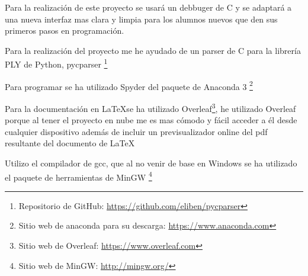 
Para la realización de este proyecto se usará un debbuger de C y se adaptará a una nueva interfaz mas clara y limpia para los alumnos nuevos que den sus primeros pasos en programación.

Para la realización del proyecto me he ayudado de un parser de C para la librería PLY de Python, pycparser \footnote{Repositorio de GitHub: \url{https://github.com/eliben/pycparser}}

Para programar se ha utilizado Spyder del paquete de Anaconda 3 \footnote{Sitio web de anaconda para su descarga: \url{https://www.anaconda.com}}

Para la documentación en \LaTeX se ha utilizado Overleaf\footnote{Sitio web de Overleaf: \url{https://www.overleaf.com}}, he utilizado Overleaf porque al tener el proyecto en nube me es mas cómodo y fácil acceder a él desde cualquier dispositivo además de incluir un previsualizador online del pdf resultante del documento de \LaTeX

Utilizo el compilador de gcc, que al no venir de base en Windows se ha utilizado el paquete de herramientas de MinGW \footnote{Sitio web de MinGW: \url{http://mingw.org/}}
